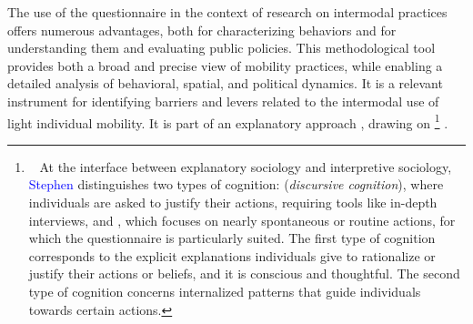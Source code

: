 \begin{refsegment}
The use of the questionnaire in the context of research on intermodal practices offers numerous advantages, both for characterizing behaviors and for understanding them and evaluating public policies. This methodological tool provides both a broad and precise view of mobility practices, while enabling a detailed analysis of behavioral, spatial, and political dynamics. It is a relevant instrument for identifying barriers and levers related to the intermodal use of light individual mobility. It is part of an explanatory approach \textcolor{blue}{\autocite[20]{singly_questionnaire_2016}}, drawing on \footnote{~ 
    At the interface between explanatory sociology and interpretive sociology, \textcolor{blue}{Stephen} \textcolor{blue}{\textcite[1683]{vaisey_motivation_2009}} distinguishes two types of cognition:  (\textsl{discursive cognition}), where individuals are asked to justify their actions, requiring tools like in-depth interviews, and , which focuses on nearly spontaneous or routine actions, for which the questionnaire is particularly suited. The first type of cognition corresponds to the explicit explanations individuals give to rationalize or justify their actions or beliefs, and it is conscious and thoughtful. The second type of cognition concerns internalized patterns that guide individuals towards certain actions.
} \textcolor{blue}{\autocite[1683]{vaisey_motivation_2009}}.%


\end{refsegment}
